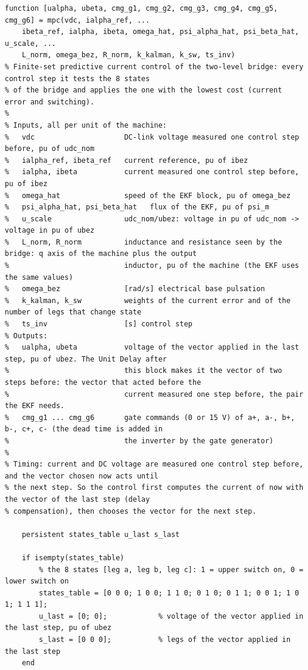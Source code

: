 \documentclass[11pt,a4paper]{scrartcl}
\begin{document}
\begin{onehalfspace}
\begin{singlespace}
\fontsize{7.5}{9}\selectfont
\begin{verbatim}
function [ualpha, ubeta, cmg_g1, cmg_g2, cmg_g3, cmg_g4, cmg_g5, cmg_g6] = mpc(vdc, ialpha_ref, ...
    ibeta_ref, ialpha, ibeta, omega_hat, psi_alpha_hat, psi_beta_hat, u_scale, ...
    L_norm, omega_bez, R_norm, k_kalman, k_sw, ts_inv)
% Finite-set predictive current control of the two-level bridge: every control step it tests the 8 states
% of the bridge and applies the one with the lowest cost (current error and switching).
%
% Inputs, all per unit of the machine:
%   vdc                     DC-link voltage measured one control step before, pu of udc_nom
%   ialpha_ref, ibeta_ref   current reference, pu of ibez
%   ialpha, ibeta           current measured one control step before, pu of ibez
%   omega_hat               speed of the EKF block, pu of omega_bez
%   psi_alpha_hat, psi_beta_hat   flux of the EKF, pu of psi_m
%   u_scale                 udc_nom/ubez: voltage in pu of udc_nom -> voltage in pu of ubez
%   L_norm, R_norm          inductance and resistance seen by the bridge: q axis of the machine plus the output
%                           inductor, pu of the machine (the EKF uses the same values)
%   omega_bez               [rad/s] electrical base pulsation
%   k_kalman, k_sw          weights of the current error and of the number of legs that change state
%   ts_inv                  [s] control step
% Outputs:
%   ualpha, ubeta           voltage of the vector applied in the last step, pu of ubez. The Unit Delay after
%                           this block makes it the vector of two steps before: the vector that acted before the
%                           current measured one step before, the pair the EKF needs.
%   cmg_g1 ... cmg_g6       gate commands (0 or 15 V) of a+, a-, b+, b-, c+, c- (the dead time is added in
%                           the inverter by the gate generator)
%
% Timing: current and DC voltage are measured one control step before, and the vector chosen now acts until
% the next step. So the control first computes the current of now with the vector of the last step (delay
% compensation), then chooses the vector for the next step.

    persistent states_table u_last s_last

    if isempty(states_table)
        % the 8 states [leg a, leg b, leg c]: 1 = upper switch on, 0 = lower switch on
        states_table = [0 0 0; 1 0 0; 1 1 0; 0 1 0; 0 1 1; 0 0 1; 1 0 1; 1 1 1];
        u_last = [0; 0];            % voltage of the vector applied in the last step, pu of ubez
        s_last = [0 0 0];           % legs of the vector applied in the last step
    end


\end{verbatim}
\end{singlespace}
\end{onehalfspace}
\end{document}
